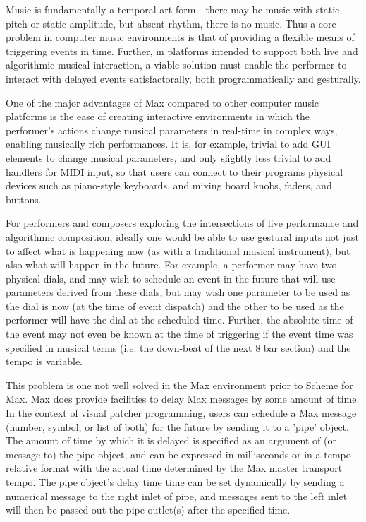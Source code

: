 \documentclass[acmsmall]{acmart}
\begin{document}
Music is fundamentally a temporal art form - there may be music with static pitch
or static amplitude, but absent rhythm, there is no music.  %
Thus a core problem in computer music environments  is that of providing a flexible 
means of triggering events in time. Further, in platforms intended to support both
live and algorithmic musical interaction, a viable solution must enable the performer to interact
with delayed events satisfactorally, both programmatically and gesturally. 

One of the major advantages of Max compared to other computer music platforms 
is the ease of creating interactive environments in which the performer's actions 
change musical parameters in real-time in complex ways, enabling 
musically rich performances. It is, for example, trivial to add GUI elements to change
musical parameters, and only slightly less trivial to add handlers for MIDI input, 
so that users can connect to their programs physical devices such as
piano-style keyboards, and mixing board knobs, faders, and buttons. 

For performers and composers exploring the intersections of live performance and algorithmic
composition, ideally one would be able to use gestural inputs not just to affect
what is happening now (as with a traditional musical instrument), but also what will 
happen in the future. For example, a performer may have two physical dials,
and may wish to schedule an event in the future that will use parameters derived
from these dials, but may wish one parameter to be used as the dial is now
(at the time of event dispatch) 
and the other to be used as the performer will have the dial at the scheduled time.
Further, the absolute time of the event may not even be known at the time of 
triggering if the event time was specified in musical terms 
(i.e. the down-beat of the next 8 bar section) and the tempo is variable. 

This problem is one not well solved in the Max environment prior 
to Scheme for Max. Max does provide facilities to delay Max messages by some
amount of time. In the context of visual patcher programming, users can schedule 
a Max message (number, symbol, or list of both) for the future by sending it to a 
'pipe' object. The amount of time by which it is delayed is specified as an argument of
(or message to) the pipe object, and can be expressed in milliseconds or in a tempo 
relative format with the actual time determined by the Max master transport tempo. 
The pipe object’s delay time time can be set dynamically by sending a numerical message
to the right inlet of pipe, and messages sent to the left inlet will then be passed out
the pipe outlet(s) after the specified time. 
\end{document}
